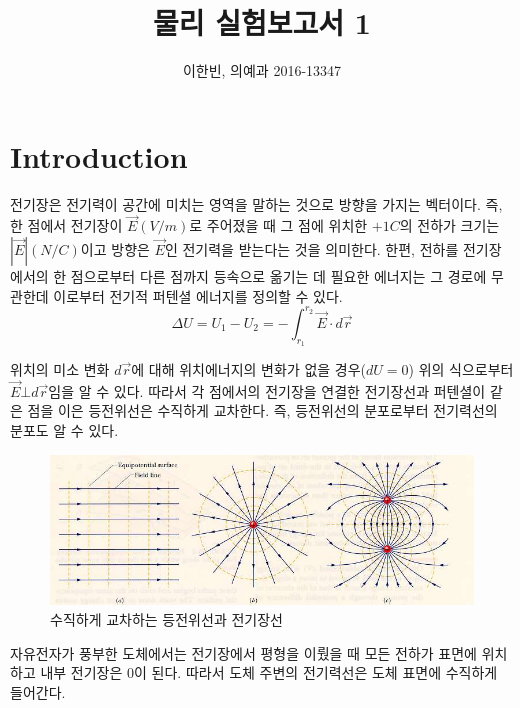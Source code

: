 \documentclass[a4paper]{article}
\title{물리 실험보고서 1}
\author{이한빈, 의예과 2016-13347}
\begin{document}
\maketitle

\section{Introduction}


	전기장은 전기력이 공간에 미치는 영역을 말하는 것으로 방향을 가지는 벡터이다. 
	즉, 한 점에서 전기장이 $\vec{E}(V/m)$로 주어졌을 때 그 점에 위치한 $+1C$의 전하가 크기는 $|\vec{E}|(N/C)$이고 방향은 $\vec{E}$인 전기력을 받는다는 것을 의미한다.
 	한편, 전하를 전기장에서의 한 점으로부터 다른 점까지 등속으로 옮기는 데 필요한 에너지는 그 경로에 무관한데 이로부터 전기적 퍼텐셜 에너지를 정의할 수 있다.
		\begin{equation}
			\Delta{} U = U_{1}-U_{2} = -\int_{r_{1}}^{r_{2}} \vec{E} \cdot d\vec{r} 
		\end{equation}



	위치의 미소 변화 $d\vec{r}$에 대해 위치에너지의 변화가 없을 경우($dU=0$) 위의 식으로부터 $\vec{E}\bot{}d\vec{r}$임을 알 수 있다. 
	따라서 각 점에서의 전기장을 연결한 전기장선과 퍼텐셜이 같은 점을 이은 등전위선은 수직하게 교차한다. 
	즉, 등전위선의 분포로부터 전기력선의 분포도 알 수 있다.

		\begin{figure}[htbp]
			\begin{center}
			    \includegraphics[width=\textwidth]{img/electircfield.png}
    			\caption{수직하게 교차하는 등전위선과 전기장선} \label{fig:ex1}
			\end{center}
		\end{figure}

	자유전자가 풍부한 도체에서는 전기장에서 평형을 이뤘을 때 모든 전하가 표면에 위치하고 내부 전기장은 0이 된다. 
	따라서 도체 주변의 전기력선은 도체 표면에 수직하게 들어간다.
\newpage
\end{document}
